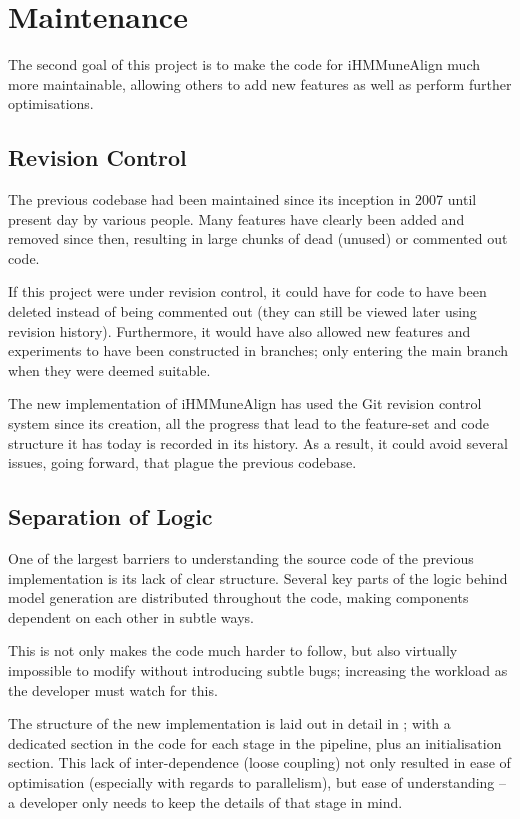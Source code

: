 \section{Maintenance}
The second goal of this project is to make the code for iHMMuneAlign much more maintainable, allowing others to add new features as well as perform further optimisations.


\subsection{Revision Control}
The previous codebase had been maintained since its inception in 2007 until present day by various people. Many features have clearly been added and removed since then, resulting in large chunks of dead (unused) or commented out code.

If this project were under revision control, it could have for code to have been deleted instead of being commented out (they can still be viewed later using revision history). Furthermore, it would have also allowed new features and experiments to have been constructed in branches; only entering the main branch when they were deemed suitable.

The new implementation of iHMMuneAlign has used the Git revision control system since its creation, all the progress that lead to the feature-set and code structure it has today is recorded in its history. As a result, it could avoid several issues, going forward, that plague the previous codebase.

\leavevmode
\subsection{Separation of Logic}
One of the largest barriers to understanding the source code of the previous implementation is its lack of clear structure. Several key parts of the logic behind model generation are distributed throughout the code, making components dependent on each other in subtle ways. 

This is not only makes the code much harder to follow, but also virtually impossible to modify without introducing subtle bugs; increasing the workload as the developer must watch for this.

The structure of the new implementation is laid out in detail in ; with a dedicated section in the code for each stage in the pipeline, plus an initialisation section. This lack of inter-dependence (loose coupling) not only resulted in ease of optimisation (especially with regards to parallelism), but ease of understanding -- a developer only needs to keep the details of that stage in mind.
	
